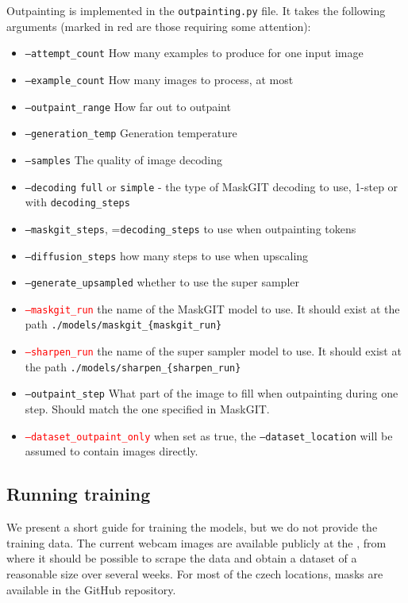 Outpainting is implemented in the \texttt{outpainting.py} file. It takes the following arguments (marked in red are those requiring some attention):
\begin{itemize}
    \item \texttt{--attempt\_count} How many examples to produce for one input image
    \item \texttt{--example\_count} How many images to process, at most
    \item \texttt{--outpaint\_range} How far out to outpaint
    \item \texttt{--generation\_temp} Generation temperature
    \item \texttt{--samples} The quality of image decoding
    \item \texttt{--decoding} \texttt{full} or \texttt{simple} - the type of MaskGIT decoding to use, 1-step or with \texttt{decoding\_steps}
    \item \texttt{--maskgit\_steps}, =\texttt{decoding\_steps} to use when outpainting tokens
    \item \texttt{--diffusion\_steps} how many steps to use when upscaling
    \item \texttt{--generate\_upsampled} whether to use the super sampler
    \item \textcolor{red}{\texttt{--maskgit\_run}} the name of the MaskGIT model to use. It should exist at the path \texttt{./models/maskgit\_\{maskgit\_run\}}
    \item \textcolor{red}{\texttt{--sharpen\_run}} the name of the super sampler model to use. It should exist at the path \texttt{./models/sharpen\_\{sharpen\_run\}}
    \item \texttt{--outpaint\_step} What part of the image to fill when outpainting during one step. Should match the one specified in MaskGIT.
    \item \textcolor{red}{\texttt{--dataset\_outpaint\_only}} when set as true, the \texttt{--dataset\_location} will be assumed to contain images directly.
\end{itemize}


\subsection{Running training}

We present a short guide for training the models, but we do not provide the training data. The current webcam images are available publicly at the \citep{chmi_webcams}, from where it should be possible to scrape the data and obtain a dataset of a reasonable size over several weeks. For most of the czech locations, masks are available in the GitHub repository.


